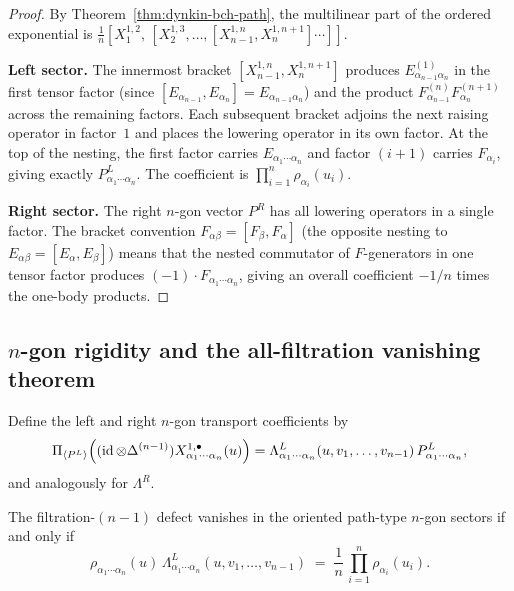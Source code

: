 \begin{proof}
By Theorem~\ref{thm:dynkin-bch-path}, the multilinear part of the
ordered exponential is
$\frac{1}{n}[X_1^{1,2},\,[X_2^{1,3},\ldots,
[X_{n-1}^{1,n},X_n^{1,n+1}]\cdots]]$.

\medskip\noindent\textbf{Left sector.}
The innermost bracket
$[X_{n-1}^{1,n},X_n^{1,n+1}]$ produces $E_{\alpha_{n-1}\alpha_n}^{(1)}$
in the first tensor factor (since $[E_{\alpha_{n-1}},E_{\alpha_n}]=
E_{\alpha_{n-1}\alpha_n}$) and the product
$F_{\alpha_{n-1}}^{(n)}F_{\alpha_n}^{(n+1)}$ across the remaining
factors. Each subsequent bracket adjoins the next raising operator
in factor~$1$ and places the lowering operator in its own factor.
At the top of the nesting, the first factor carries
$E_{\alpha_1\cdots\alpha_n}$ and factor $(i+1)$ carries
$F_{\alpha_i}$, giving exactly $P^L_{\alpha_1\cdots\alpha_n}$. The
coefficient is $\prod_{i=1}^{n}\rho_{\alpha_i}(u_i)$.

\medskip\noindent\textbf{Right sector.}
The right $n$-gon vector $P^R$ has all lowering operators in a single
factor. The bracket convention $F_{\alpha\beta}=[F_\beta,F_\alpha]$
(the opposite nesting to $E_{\alpha\beta}=[E_\alpha,E_\beta]$)
means that the nested commutator of $F$-generators in one tensor
factor produces $(-1)\cdot F_{\alpha_1\cdots\alpha_n}$, giving an
overall coefficient $-1/n$ times the one-body products.
\end{proof}

\subsection{$n$-gon rigidity and the all-filtration vanishing theorem}

\begin{definition}
Define the left and right $n$-gon transport coefficients by
\[
\Pi_{\langle P^L\rangle}
\Bigl(
(\operatorname{id}\otimes\Delta^{(n-1)})
X_{\alpha_1\cdots\alpha_n}^{1,\bullet}(u)
\Bigr)
=
\Lambda_{\alpha_1\cdots\alpha_n}^{L}(u,v_1,\ldots,v_{n-1})\,
P_{\alpha_1\cdots\alpha_n}^{L},
\]
and analogously for $\Lambda^R$.
\end{definition}

\begin{theorem}
\label{thm:ngon-rigidity}
The filtration-$(n{-}1)$ defect vanishes in the oriented path-type
$n$-gon sectors if and only if
\begin{equation}\label{eq:ngon-rigidity}
\rho_{\alpha_1\cdots\alpha_n}(u)\,
\Lambda_{\alpha_1\cdots\alpha_n}^{L}(u,v_1,\ldots,v_{n-1})
\;=\;
\frac{1}{n}\,
\prod_{i=1}^{n}\rho_{\alpha_i}(u_i).
\end{equation}
\end{theorem}


